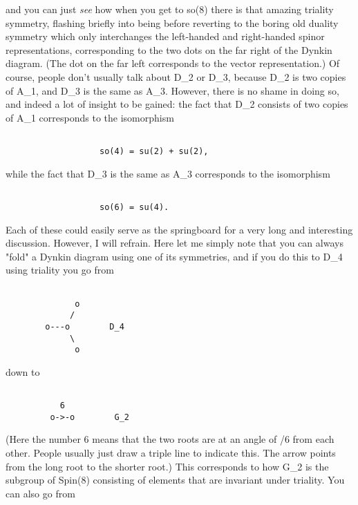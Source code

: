 and you can just \emph{see} how when you get to so(8) there is that
amazing triality symmetry, flashing briefly into being before reverting
to the boring old duality symmetry which only interchanges the 
left-handed and right-handed spinor representations, corresponding
to the two dots on the far right of the Dynkin diagram.  (The dot
on the far left corresponds to the vector representation.)
Of course, people don't usually talk about D_2 or D_3, because 
D_2 is two copies of A_1, and D_3 is the same as A_3.  However, 
there is no shame in doing so, and indeed a lot of insight to 
be gained: the fact that D_2 consists of two copies of A_1 
corresponds to the isomorphism

\begin{verbatim}

                   so(4) = su(2) + su(2),
\end{verbatim}
    
while the fact that D_3 is the same as A_3 corresponds to the 
isomorphism

\begin{verbatim}

                   so(6) = su(4).
\end{verbatim}
    
Each of these could easily serve as the springboard for a very
long and interesting discussion.  However, I will refrain.  Here
let me simply note that you can always "fold" a Dynkin diagram using
one of its symmetries, and if you do this to D_4 using triality
you go from 

\begin{verbatim}

              o  
             /   
        o---o        D_4
             \   
              o  

\end{verbatim}
    
down to

\begin{verbatim}

           6
         o->-o        G_2
\end{verbatim}
    
(Here the number 6 means that the two roots are at an angle of
\pi /6 from each other.  People usually just draw a triple line
to indicate this.  The arrow points from the long root to the shorter
root.)  This corresponds to how G_2 is the subgroup of Spin(8) consisting 
of elements that are invariant under triality.  You can also go from

